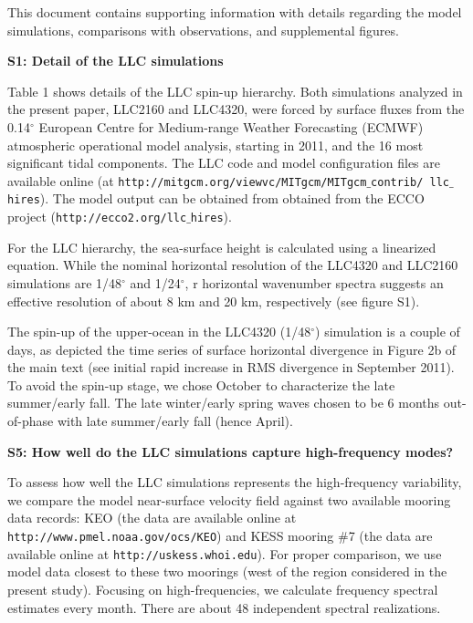 \documentclass[draft,grl]{agutexSI}
\begin{document}
\begin{article}
This document contains supporting information with details regarding the model
simulations, comparisons with observations, and supplemental figures.


\noindent\textbf{S1: Detail of the LLC simulations}

Table 1 shows details of the LLC spin-up hierarchy.
Both simulations analyzed in the present paper, LLC2160 and LLC4320,
were forced by surface fluxes from the 0.14$^\circ$ European Centre for
Medium-range Weather Forecasting (ECMWF) atmospheric operational model analysis,
 starting in 2011, and the 16 most significant  tidal components.
The LLC code and model configuration files are available online
(at \texttt{http://mitgcm.org/viewvc/MITgcm/MITgcm$\_$contrib/
llc$\_$hires}). The model output can be obtained from  obtained from the ECCO project (\texttt{http://ecco2.org/llc$\_$hires}).

For the LLC hierarchy, the sea-surface height is calculated
using a linearized equation. While the nominal horizontal resolution  of the
LLC4320 and LLC2160 simulations are 1/48$^\circ$ and 1/24$^\circ$, r
horizontal wavenumber spectra suggests an effective resolution of about 8 km and 20 km,
 respectively (see figure S1).

The spin-up of the upper-ocean in the LLC4320 (1/48$^\circ$) simulation is
a couple of days, as depicted the time series of surface horizontal divergence
in Figure 2b of the main text (see initial rapid increase in RMS divergence in
September 2011). To avoid the spin-up stage, we chose October to characterize the
late summer/early fall. The late winter/early spring waves chosen to be 6 months
out-of-phase with late summer/early fall (hence April).

\noindent\textbf{S5: How well do the LLC simulations capture high-frequency modes?}

To assess how well the LLC simulations represents the high-frequency variability,
we compare the model near-surface velocity field against two available
mooring data records: KEO (the data are available online at \texttt{http://www.pmel.noaa.gov/ocs/KEO})
and KESS mooring $\#$7 (the data are available online at \texttt{http://uskess.whoi.edu}).
For proper comparison, we use model data closest to these two moorings (west of
the region considered in the present study). Focusing on high-frequencies, we
calculate frequency spectral estimates every month. There are about 48 independent
spectral realizations.


\end{article}
\end{document}

